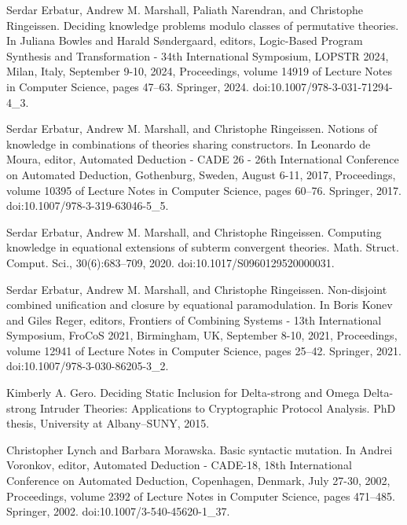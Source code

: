 \par\noindent  [15]  Serdar Erbatur, Andrew M. Marshall, Paliath Narendran, and Christophe Ringeissen.  Deciding knowledge problems modulo classes of permutative theories.  In Juliana Bowles and Harald Søndergaard, editors, Logic-Based Program Synthesis and Transformation - 34th International Symposium, LOPSTR 2024, Milan, Italy, September 9-10, 2024, Proceedings, volume 14919 of Lecture Notes in Computer Science, pages 47–63. Springer, 2024.  doi:10.1007/978-3-031-71294-4\_3.  
 
\par\noindent  [16]  Serdar Erbatur, Andrew M. Marshall, and Christophe Ringeissen.  Notions of knowledge in combinations of theories sharing constructors.  In Leonardo de Moura, editor, Automated Deduction - CADE 26 - 26th International Conference on Automated Deduction, Gothenburg, Sweden, August 6-11, 2017, Proceedings, volume 10395 of Lecture Notes in Computer Science, pages 60–76. Springer, 2017.  doi:10.1007/978-3-319-63046-5\_5.  
 
\par\noindent  [17]  Serdar Erbatur, Andrew M. Marshall, and Christophe Ringeissen.  Computing knowledge in equational extensions of subterm convergent theories.  Math. Struct. Comput. Sci., 30(6):683–709, 2020.  doi:10.1017/S0960129520000031.  
 
\par\noindent  [18]  Serdar Erbatur, Andrew M. Marshall, and Christophe Ringeissen.  Non-disjoint combined unification and closure by equational paramodulation.  In Boris Konev and Giles Reger, editors, Frontiers of Combining Systems - 13th International Symposium, FroCoS 2021, Birmingham, UK, September 8-10, 2021, Proceedings, volume 12941 of Lecture Notes in Computer Science, pages 25–42. Springer, 2021.  doi:10.1007/978-3-030-86205-3\_2.  
 
\par\noindent  [19]  Kimberly A. Gero.  Deciding Static Inclusion for Delta-strong and Omega Delta-strong Intruder Theories: Applications to Cryptographic Protocol Analysis.  PhD thesis, University at Albany–SUNY, 2015.  
 
\par\noindent  [20]  Christopher Lynch and Barbara Morawska.  Basic syntactic mutation.  In Andrei Voronkov, editor, Automated Deduction - CADE-18, 18th International Conference on Automated Deduction, Copenhagen, Denmark, July 27-30, 2002, Proceedings, volume 2392 of Lecture Notes in Computer Science, pages 471–485. Springer, 2002.  doi:10.1007/3-540-45620-1\_37.  
 
